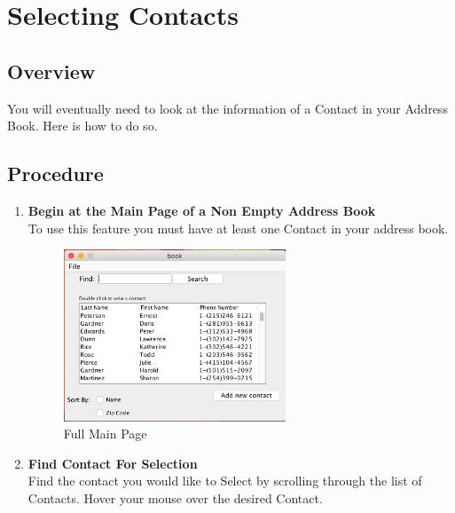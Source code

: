 \documentclass[a4paper, 11pt]{article}
\begin{document}
\section{Selecting Contacts}
\subsection{Overview}
You will eventually need to look at the information of a Contact in your Address Book. Here is how to do so.
\subsection{Procedure}
\begin{enumerate}[label=\textbf{\arabic*})]
    \item{\textbf{Begin at the Main Page of a Non Empty Address Book}}\\ To use this feature you must have at least one Contact in your address book.
    
    \begin{figure}[h!]
    \centering
      \includegraphics[width=250]{main_page_full.png}
      \caption{Full Main Page}
    \end{figure}
    
    \item{\textbf{Find Contact For Selection}}\\ Find the contact you would like to Select by scrolling through the list of Contacts. Hover your mouse over the desired Contact. 
    

\end{enumerate}
\end{document}
